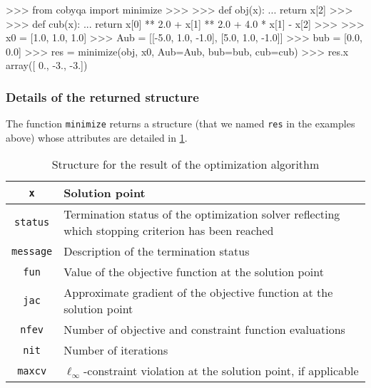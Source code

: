 \begin{lstpython}[%
    caption=An example of \gls{cobyqa} with nonlinear constraints,
    label=lst:cobyqa-problem-g,
]
    >>> from cobyqa import minimize
    >>>
    >>> def obj(x):
    ...     return x[2]
    >>>
    >>> def cub(x):
    ...     return x[0] ** 2.0 + x[1] ** 2.0 + 4.0 * x[1] - x[2] 
    >>>
    >>> x0 = [1.0, 1.0, 1.0]
    >>> Aub = [[-5.0, 1.0, -1.0], [5.0, 1.0, -1.0]]
    >>> bub = [0.0, 0.0]
    >>> res = minimize(obj, x0, Aub=Aub, bub=bub, cub=cub)
    >>> res.x
    array([ 0., -3., -3.])   
\end{lstpython}

\subsubsection{Details of the returned structure}

The function \texttt{minimize} returns a structure (that we named \texttt{res} in the examples above) whose attributes are detailed in \cref{tab:optimize-result}.

\begin{table}[ht]
    \caption{Structure for the result of the optimization algorithm}
    \label{tab:optimize-result}
    \centering
    \begin{tabularx}{\textwidth}{cX}
        \toprule
        \texttt{x}          & Solution point\\
        \midrule
        \texttt{status}     & Termination status of the optimization solver reflecting which stopping criterion has been reached\\
        \midrule
        \texttt{message}    & Description of the termination status\\
        \midrule
        \texttt{fun}        & Value of the objective function at the solution point\\
        \midrule
        \texttt{jac}        & Approximate gradient of the objective function at the solution point\\
        \midrule
        \texttt{nfev}       & Number of objective and constraint function evaluations\\
        \midrule
        \texttt{nit}        & Number of iterations\\
        \midrule
        \texttt{maxcv}      & $\ell_{\infty}$-constraint violation at the solution point, if applicable\\
        \bottomrule
    \end{tabularx}
\end{table}

